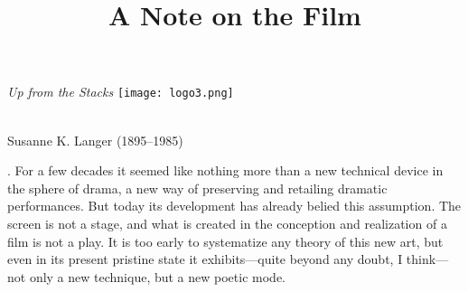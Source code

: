 \documentclass{tufte-handout}
\title[A Note on the Film]{A Note on the Film} %
\begin{document}
\begin{titlepage}

\begin{fullwidth}
\noindent\LARGE\emph{Up from the Stacks
} \hspace{73mm}\texttt{[image: logo3.png]}\\
\noindent\hrulefill\\
\vspace*{1em}

\vspace*{1.5em}

\noindent\LARGE{Susanne K. Langer (1895–1985)}\par{}
\vspace*{0.5em}






\end{fullwidth}

\vspace*{1em}


. For a few decades it seemed like noth­ing more than a
new technical device in the sphere of drama, a new way of preserving and
retailing dramatic performances. But today its devel­opment has already
belied this assumption. The screen is not a stage, and what is created
in the conception and realization of a film is not a play. It is too
early to systematize any theory of this new art, but even in its present
pristine state it exhibits---quite beyond any doubt, I think---not only
a new technique, but a new poetic mode.


\end{titlepage}
\end{document}
